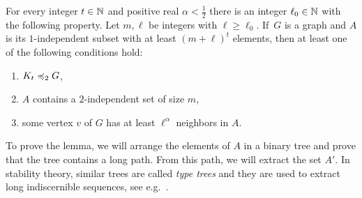 \begin{lemma}\label{lem:apex}
For every integer $t\in \mathbb{N}$ and positive real $\alpha<\frac 1 2$ 
there is an integer $\ell_0\in\mathbb{N}$ with the following property.
Let $m,\ell$ be integers with $\ell\ge \ell_0$. 
If~$G$ is a graph and $A$ is its $1$-independent subset
with at least $(m+\ell)^{t}$ elements,
then at least one of the following conditions hold:
\begin{enumerate}
  \item $K_t\preccurlyeq_{2} G$,
\item  $A$ contains a $2$-independent set of size $m$, 
\item  some vertex $v$ of $G$
has at least $\ell^{\alpha}$ neighbors in $A$.
\end{enumerate}
\end{lemma}


To prove the lemma, we will arrange the elements of $A$ in a binary tree
and prove that the tree contains a long path. From this path, we will 
extract the set $A'$. In stability theory, similar trees are called \emph{type trees} and they are used to extract long indiscernible sequences, see e.g.~\cite{malliaris2014regularity}. 

